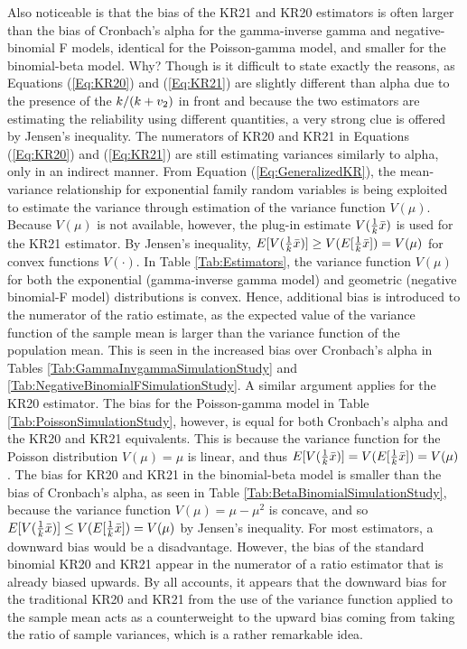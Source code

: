 \documentclass[12pt,epsfig]{article}
\newcommand{\changed}[1]{\textcolor{black}{#1}}
\newcommand{\testlength}{\changed{k}}%
\begin{document}
Also noticeable is that the bias of the KR21 and KR20 estimators is often larger than the bias of Cronbach's alpha for the gamma-inverse gamma and negative-binomial F models, identical for the Poisson-gamma model, and smaller for the binomial-beta model. Why? Though is it difficult to state exactly the reasons, as Equations (\ref{Eq:KR20}) and (\ref{Eq:KR21}) are slightly different than alpha due to the presence of the $\testlength/(\testlength + v_2)$ in front and because the two estimators are estimating the reliability using different quantities, a very strong clue is offered by Jensen's inequality. The numerators of KR20 and KR21 in Equations (\ref{Eq:KR20}) and (\ref{Eq:KR21}) are still estimating variances similarly to alpha, only in an indirect manner. From Equation (\ref{Eq:GeneralizedKR}), the mean-variance relationship for exponential family random variables is being exploited to estimate the variance through estimation of the variance function $V(\mu)$. Because $V(\mu)$ is not available, however, the plug-in estimate $V(\frac{1}{\testlength} \bar{x})$ is used for the KR21 estimator. By Jensen's inequality, $E[V(\frac{1}{\testlength} \bar{x})] \ge V(E[\frac{1}{\testlength} \bar{x}]) = V(\mu)$ for convex functions $V(\cdot)$. In Table \ref{Tab:Estimators}, the variance function $V(\mu)$ for both the exponential (gamma-inverse gamma model) and geometric (negative binomial-F model) distributions is convex. Hence, additional bias is introduced to the numerator of the ratio estimate, as the expected value of the variance function of the sample mean is larger than the variance function of the population mean. This is seen in the increased bias over Cronbach's alpha in Tables \ref{Tab:GammaInvgammaSimulationStudy} and \ref{Tab:NegativeBinomialFSimulationStudy}. A similar argument applies for the KR20 estimator.  The bias for the Poisson-gamma model in Table \ref{Tab:PoissonSimulationStudy}, however, is equal for both Cronbach's alpha and the KR20 and KR21 equivalents. This is because the variance function for the Poisson distribution $V(\mu) = \mu$ is linear, and thus $E[V(\frac{1}{\testlength} \bar{x})] = V(E[\frac{1}{\testlength} \bar{x}]) = V(\mu)$.  The bias for KR20 and KR21 in the binomial-beta model is smaller than the bias of Cronbach's alpha, as seen in Table \ref{Tab:BetaBinomialSimulationStudy}, because the variance function $V(\mu) = \mu - \mu^2$ is concave, and so $E[V(\frac{1}{\testlength} \bar{x})] \le V(E[\frac{1}{\testlength} \bar{x}]) = V(\mu)$ by Jensen's inequality. For most estimators, a downward bias would be a disadvantage. However, the bias of  the standard binomial KR20 and KR21 appear in the numerator of a ratio estimator that is already biased upwards. By all accounts, it appears that the downward bias for the traditional KR20 and KR21 from the use of the variance function applied to the sample mean acts as a counterweight to the upward bias coming from taking the ratio of sample variances, which is a rather remarkable idea.  %
\end{document}
